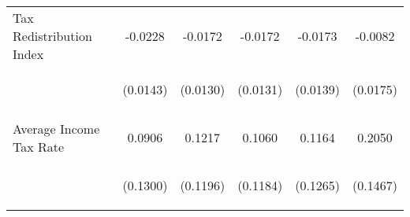 \begin{center}
\begin{tabular}{lccccc}
\noalign{\smallskip}Tax Redistribution Index & \begin{scriptsize}-0.0228\end{scriptsize} & \begin{scriptsize}-0.0172\end{scriptsize} & \begin{scriptsize}-0.0172\end{scriptsize} & \begin{scriptsize}-0.0173\end{scriptsize} & \begin{scriptsize}-0.0082\end{scriptsize}\\
 & \begin{scriptsize}(0.0143)\end{scriptsize} & \begin{scriptsize}(0.0130)\end{scriptsize} & \begin{scriptsize}(0.0131)\end{scriptsize} & \begin{scriptsize}(0.0139)\end{scriptsize} & \begin{scriptsize}(0.0175)\end{scriptsize}\\
\noalign{\smallskip}Average Income Tax Rate & \begin{scriptsize}0.0906\end{scriptsize} & \begin{scriptsize}0.1217\end{scriptsize} & \begin{scriptsize}0.1060\end{scriptsize} & \begin{scriptsize}0.1164\end{scriptsize} & \begin{scriptsize}0.2050\end{scriptsize}\\
 & \begin{scriptsize}(0.1300)\end{scriptsize} & \begin{scriptsize}(0.1196)\end{scriptsize} & \begin{scriptsize}(0.1184)\end{scriptsize} & \begin{scriptsize}(0.1265)\end{scriptsize} & \begin{scriptsize}(0.1467)\end{scriptsize}\\

\end{tabular}
\end{center}
